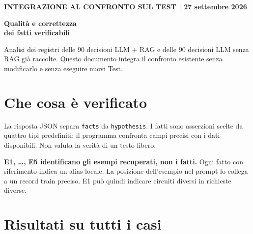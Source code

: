 \documentclass[a4paper,10pt]{article}
\newcommand{\tagline}[1]{{\small\color{ink}\textbf{#1}}\par}
\begin{document}
\tagline{INTEGRAZIONE AL CONFRONTO SUL TEST | 27 settembre 2026}
{\LARGE\bfseries Qualità e correttezza\\dei fatti verificabili}\par
Analisi dei registri delle 90 decisioni LLM + RAG e delle 90 decisioni LLM senza RAG già raccolte.
Questo documento integra il confronto esistente senza modificarlo e senza eseguire nuovi Test.
\section*{Che cosa è verificato}
La risposta JSON separa \texttt{facts} da \texttt{hypothesis}. I fatti sono asserzioni scelte da quattro
tipi predefiniti: il programma confronta campi precisi con i dati disponibili. Non valuta la verità di un testo libero.

\textbf{E1, \ldots, E5 identificano gli esempi recuperati, non i fatti.}
Ogni fatto con riferimento indica un alias locale. La posizione dell'esempio nel prompt lo collega
a un record train preciso. E1 può quindi indicare circuiti diversi in richieste diverse.
\begin{center}
\end{center}
\section*{Risultati su tutti i casi}
\end{document}

